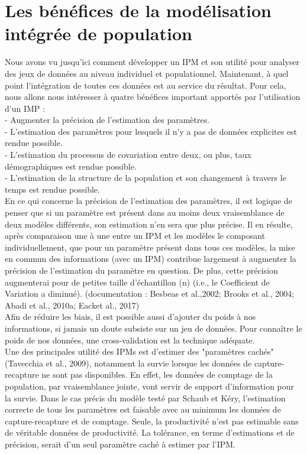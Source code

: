 \documentclass[12pt,a4paper]{article}
\begin{document}
\section{Les bénéfices de la modélisation intégrée de population}
Nous avons vu jusqu'ici comment développer un IPM et son utilité pour analyser des jeux de données au niveau individuel et populationnel. Maintenant, à quel point l'intégration de toutes ces données est au service du résultat. Pour cela, nous allons nous intéresser à quatre bénéfices important apportés par l'utilisation d'un IMP : \\
- Augmenter la précision de l'estimation des paramètres.\\
- L'estimation des paramètres pour lesquels il n'y a pas de données explicites est rendue possible.\\
- L'estimation du processus de covariation entre deux, ou plus, taux démographiques est rendue possible.\\
- L'estimation de la structure de la population et son changement à travers le temps est rendue possible.\vspace*{0,5cm}\\

En ce qui concerne la précision de l'estimation des paramètres, il est logique de penser que si un paramètre est présent dans au moins deux vraisemblance de deux modèles différents, son estimation n'en sera que plus précise.
Il en résulte, après comparaison une à une entre un IPM et les modèles le composant individuellement, que pour un paramètre présent dans tous ces modèles, la mise en commun des informations (avec un IPM) contribue largement à augmenter la précision de l'estimation du paramètre en question. De plus, cette précision augmenterai pour de petites taille d'échantillon (n) (i.e., le Coefficient de Variation a diminué). (documentation : Besbeas et al.,2002; Brooks et al., 2004; Abadi et al., 2010a; Eacket al., 2017)\\
Afin de réduire les biais, il est possible aussi d'ajouter du poids à nos informations, si jamais un doute subsiste sur un jeu de données. Pour connaître le poids de nos données, une cross-validation est la technique adéquate.\\
Une des principales utilité des IPMs est d'estimer des "paramètres cachés" (Tavecchia et al., 2009), notamment la survie lorsque les données de capture-recapture ne sont pas disponibles. En effet, les données de comptage de la population, par vraisemblance jointe, vont servir de support d'information pour la survie. Dans le cas précis du modèle testé par Schaub et Kéry, l'estimation correcte de tous les paramètres est faisable avec au minimum les données de capture-recapture et de comptage. Seule, la productivité n'est pas estimable sans de véritable données de productivité. La tolérance, en terme d'estimations et de précision, serait d'un seul paramètre caché à estimer par l'IPM.
\end{document}
